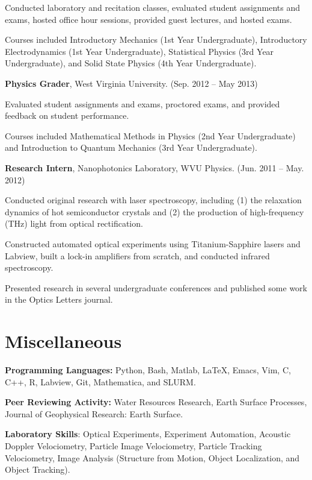 \documentclass[11pt,letterpaper]{article}
\renewenvironment{itemize}{
	\begin{list}{}{
			\setlength{\leftmargin}{1.5em}
			\setlength{\rightmargin}{0em}  %
			\setlength{\itemsep}{0.25em}
			\setlength{\parskip}{0pt}
			\setlength{\parsep}{0.25em}
		}
	}{
	\end{list}
}
\newenvironment{itemizeit}
{\itemize\let\origitem\item
	\renewcommand{\item}[1][default]
	{\origitem[\tiny $\blacksquare$]}}
{\enditemize}
\renewenvironment{itemize}{
	\begin{list}{}{
			\setlength{\leftmargin}{1.5em}
			\setlength{\itemsep}{0.25em}
			\setlength{\parskip}{0pt}
			\setlength{\parsep}{0.25em}
		}
	}{
	\end{list}
}
\begin{document}
\begin{itemize}
	\begin{itemizeit}
		\item Conducted laboratory and recitation classes, evaluated student assignments and exams, hosted office hour sessions, provided guest lectures, and hosted exams.
		\item Courses included Introductory Mechanics (1st Year Undergraduate), Introductory Electrodynamics (1st Year Undergraduate), Statistical Physics (3rd Year Undergraduate), and Solid State Physics (4th Year Undergraduate).
	\end{itemizeit}


\item {\bf Physics Grader}, West Virginia University. \hfill (Sep. 2012 -- May 2013)

\begin{itemizeit}
	\item Evaluated student assignments and exams, proctored exams, and provided feedback on student performance.
	\item Courses included Mathematical Methods in Physics (2nd Year Undergraduate) and Introduction to Quantum Mechanics (3rd Year Undergraduate).
\end{itemizeit}

\item {\bf Research Intern}, Nanophotonics Laboratory, WVU Physics. \hfill (Jun. 2011 -- May. 2012)

\begin{itemizeit}
	\item Conducted original research with laser spectroscopy, including (1) the relaxation dynamics of hot semiconductor crystals and (2) the production of high-frequency (THz) light from optical rectification.
	\item Constructed automated optical experiments using Titanium-Sapphire lasers and Labview, built a lock-in amplifiers from scratch, and conducted infrared spectroscopy.
	\item Presented research in several undergraduate conferences and published some work in the Optics Letters journal.
\end{itemizeit}

\end{itemize}

	\section*{Miscellaneous}
	\begin{itemize}
		\item \textbf{Programming Languages:} Python, Bash, Matlab, \LaTeX, Emacs, Vim, C, C++, R, Labview, Git, Mathematica, and SLURM.
		\item \textbf{Peer Reviewing Activity:} Water Resources Research, Earth Surface Processes, Journal of Geophysical Research: Earth Surface.
		\item \textbf{Laboratory Skills}: Optical Experiments, Experiment Automation, Acoustic Doppler Velociometry, Particle Image Velociometry, Particle Tracking Velociometry, Image Analysis (Structure from Motion, Object Localization, and Object Tracking).
	\end{itemize}
	\vfill
\end{document}
